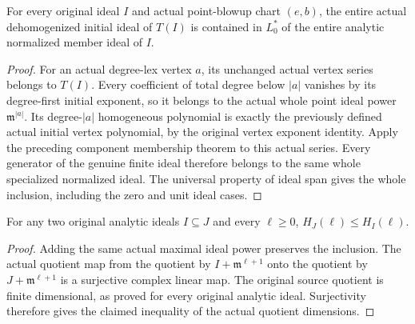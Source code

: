 \begin{theorem}
\label{hir:actual-point-whole-initial-ideal-inclusion}
\leanok
For every original ideal $I$ and actual point-blowup chart $(e,b)$,
the entire actual dehomogenized initial ideal of $T(I)$ is contained in
$L_0^*$ of the entire analytic normalized member ideal of $I$.
\end{theorem}
\begin{proof}
For an actual degree-lex vertex $a$, its unchanged actual vertex series
belongs to $T(I)$. Every coefficient of total degree below $|a|$ vanishes
by its degree-first initial exponent, so it belongs to the actual whole
point ideal power $\mathfrak m^{|a|}$. Its degree-$|a|$ homogeneous
polynomial is exactly the previously defined actual initial vertex
polynomial, by the original vertex exponent identity. Apply the preceding
component membership theorem to this actual series. Every generator of
the genuine finite ideal therefore belongs to the same whole specialized
normalized ideal. The universal property of ideal span gives the whole
inclusion, including the zero and unit ideal cases.
\end{proof}

\begin{lemma}
\label{hir:actual-whole-analytic-ideal-hs-antitone}
\leanok
For any two original analytic ideals $I\subseteq J$ and every $\ell\ge0$,
$H_J(\ell)\le H_I(\ell)$.
\end{lemma}
\begin{proof}
Adding the same actual maximal ideal power preserves the inclusion. The
actual quotient map from the quotient by $I+\mathfrak m^{\ell+1}$
onto the quotient by $J+\mathfrak m^{\ell+1}$ is a surjective complex
linear map. The original source quotient is finite dimensional, as
proved for every original analytic ideal. Surjectivity therefore gives
the claimed inequality of the actual quotient dimensions.
\end{proof}

